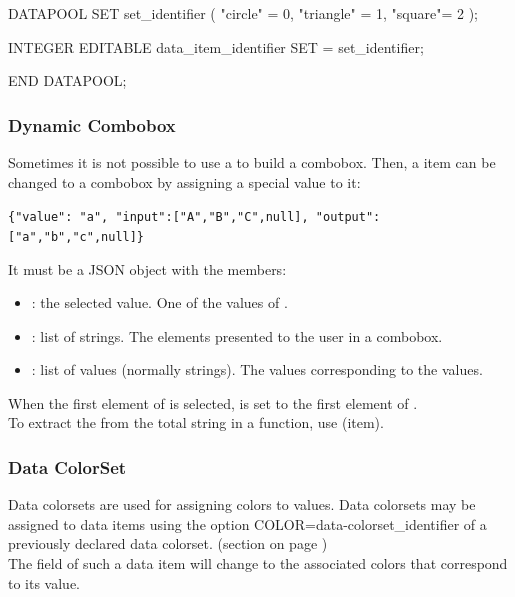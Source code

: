 \begin{boxedminipage}[t]{\linewidth}
\begin{intens}
DATAPOOL
  SET
    set_identifier ( "circle" = 0, "triangle" = 1, "square"= 2 );

  INTEGER {EDITABLE}
    data_item_identifier {SET = set_identifier};

END DATAPOOL;
\end{intens}
\end{boxedminipage}

\newpage
\subsubsection{Dynamic Combobox}
\label{stringdynamiccombobox}
Sometimes it is not possible to use a \SET{} to build a combobox. Then, a \STRING{}
item can be changed to a combobox by assigning a special value to it:

\verb+{"value": "a", "input":["A","B","C",null], "output":["a","b","c",null]}+

It must be a JSON object with the members:
\begin{itemize}
  \item {}: the selected value. One of the values of .
  \item {}: list of strings. The elements presented to the user in a combobox.
  \item {}: list of values (normally strings). The values corresponding to the  values.
\end{itemize}
When the first element of  is selected,  is set to the first element of . \\
To extract the  from the total string in a function, use \STRINGVALUE{}(item).


\newpage
\subsubsection{Data ColorSet}
\label{sec:dpcolorset}
Data colorsets are used for assigning colors to values. Data colorsets may be assigned
to data items using the option COLOR=data-colorset\_identifier of a previously declared
data colorset. (section  on page \pageref{dia:dataitemoptions}) \\
The field of such a data item will change to the associated colors that correspond to its value.\\

